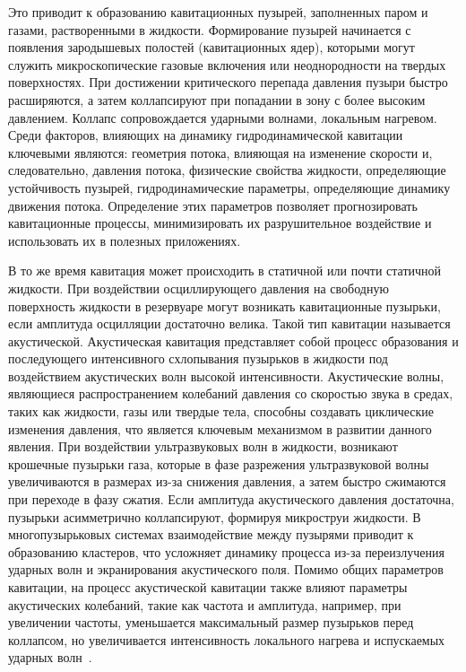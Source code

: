 Это приводит к образованию кавитационных пузырей, заполненных паром и газами, растворенными в жидкости.
Формирование пузырей начинается с появления зародышевых полостей (кавитационных ядер), которыми могут служить микроскопические газовые включения или неоднородности на твердых поверхностях. 
При достижении критического перепада давления пузыри быстро расширяются, а затем коллапсируют при попадании в зону с более высоким давлением. 
Коллапс сопровождается ударными волнами, локальным нагревом.
Среди факторов, влияющих на динамику гидродинамической кавитации ключевыми являются: геометрия потока, влияющая на изменение скорости и, следовательно, давления потока, физические свойства жидкости, определяющие устойчивость пузырей, гидродинамические параметры, определяющие динамику движения потока.
Определение этих параметров позволяет прогнозировать кавитационные процессы, минимизировать их разрушительное воздействие и использовать их в полезных приложениях.

В то же время кавитация может происходить в статичной или почти статичной жидкости.
При воздействии осциллирующего давления на свободную поверхность жидкости в резервуаре могут возникать кавитационные пузырьки, если амплитуда осцилляции достаточно велика.
Такой тип кавитации называется акустической.
Акустическая кавитация представляет собой процесс образования и последующего интенсивного схлопывания пузырьков в жидкости под воздействием акустических волн высокой интенсивности. Акустические волны, являющиеся распространением колебаний давления со скоростью звука в средах, таких как жидкости, газы или твердые тела, способны создавать циклические изменения давления, что является ключевым механизмом в развитии данного явления. 
При воздействии ультразвуковых волн в жидкости, возникают крошечные пузырьки газа, которые в фазе разрежения ультразвуковой волны увеличиваются в размерах из-за снижения давления, а затем быстро сжимаются при переходе в фазу сжатия. 
Если амплитуда акустического давления достаточна, пузырьки асимметрично коллапсируют, формируя микроструи жидкости.
В многопузырьковых системах взаимодействие между пузырями приводит к образованию кластеров, что усложняет динамику процесса из-за переизлучения ударных волн и экранирования акустического поля.
Помимо общих параметров кавитации, на процесс акустической кавитации также влияют параметры акустических колебаний, такие как частота и амплитуда, например, при увеличении частоты, уменьшается максимальный размер пузырьков перед коллапсом, но увеличивается интенсивность локального нагрева и испускаемых ударных волн~\cite{10.1007/1-4020-2233-6}.

